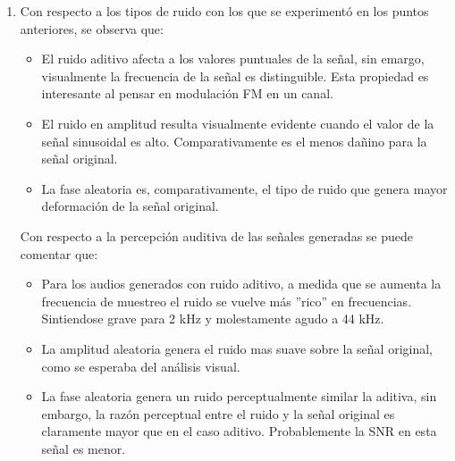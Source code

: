 \begin{enumerate}
    \item Con respecto a los tipos de ruido con los que se experimentó en los puntos anteriores, se observa que:
    \begin{itemize}
        \item El ruido aditivo afecta a los valores puntuales de la señal, sin emargo, visualmente la frecuencia de la señal es distinguible. Esta propiedad es interesante al pensar en modulación FM en un canal. 
        
        
        \item El ruido en amplitud resulta visualmente evidente cuando el valor de la señal sinusoidal es alto. Comparativamente es el menos dañino para la señal original. 
        
        \item La fase aleatoria es, comparativamente, el tipo de ruido que genera mayor deformación de la señal original.
    \end{itemize}
    
    Con respecto a la percepción auditiva de las señales generadas se puede comentar que:
    
    \begin{itemize}
        \item Para los audios generados con ruido aditivo, a medida que se aumenta la frecuencia de muestreo el ruido se vuelve más ''rico'' en frecuencias. Sintiendose grave para 2 kHz y molestamente agudo a 44 kHz.
        
        \item La amplitud aleatoria genera el ruido mas suave sobre la señal original, como se esperaba del análisis visual.
        
        \item La fase aleatoria genera un ruido perceptualmente similar la aditiva, sin embargo, la razón perceptual entre el ruido y la señal original es claramente mayor que en el caso aditivo. Probablemente la SNR en esta señal es menor.
    \end{itemize}
    
    
    
    
    
    
    
    
\end{enumerate}